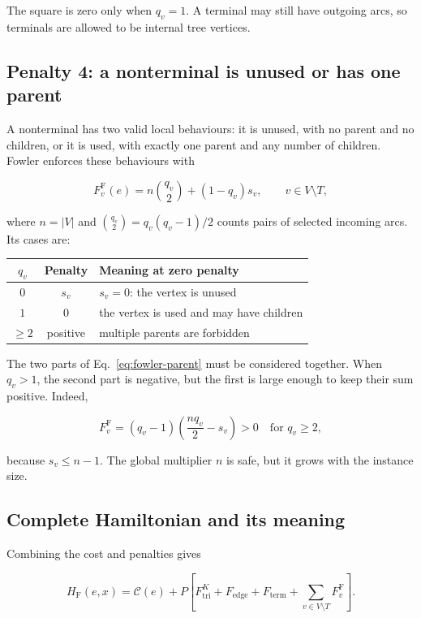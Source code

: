 \documentclass[10pt,a4paper]{article}
\newcommand{\C}{\mathcal C}
\begin{document}
The square is zero only when $q_v=1$. A terminal may still have outgoing arcs,
so terminals are allowed to be internal tree vertices.

\subsection{Penalty 4: a nonterminal is unused or has one parent}

A nonterminal has two valid local behaviours: it is unused, with no parent and
no children, or it is used, with exactly one parent and any number of children.
Fowler enforces these behaviours with

\begin{equation}
F_v^{\mathrm F}(e)=
n\binom{q_v}{2}+(1-q_v)s_v,
\qquad v\in V\setminus T,
\label{eq:fowler-parent}
\end{equation}

where $n=|V|$ and $\binom{q_v}{2}=q_v(q_v-1)/2$ counts pairs of selected
incoming arcs. Its cases are:

\begin{center}
\begin{tabular}{ccl}
\toprule
$q_v$ & Penalty & Meaning at zero penalty \\
\midrule
$0$ & $s_v$ & $s_v=0$: the vertex is unused \\
$1$ & $0$ & the vertex is used and may have children \\
$\ge2$ & positive & multiple parents are forbidden \\
\bottomrule
\end{tabular}
\end{center}

The two parts of Eq.~\eqref{eq:fowler-parent} must be considered together.
When $q_v>1$, the second part is negative, but the first is large enough to
keep their sum positive. Indeed,

\[
F_v^{\mathrm F}
=(q_v-1)\left(\frac{nq_v}{2}-s_v\right)>0
\quad\text{for }q_v\ge2,
\]

because $s_v\le n-1$. The global multiplier $n$ is safe, but it grows with the
instance size.

\subsection{Complete Hamiltonian and its meaning}

Combining the cost and penalties gives

\begin{equation}
H_{\mathrm F}(e,x)=\C(e)+P\left[
F_{\mathrm{tri}}^{K}+F_{\mathrm{edge}}+F_{\mathrm{term}}
+\sum_{v\in V\setminus T}F_v^{\mathrm F}\right].
\label{eq:fowler}
\end{equation}
\end{document}
